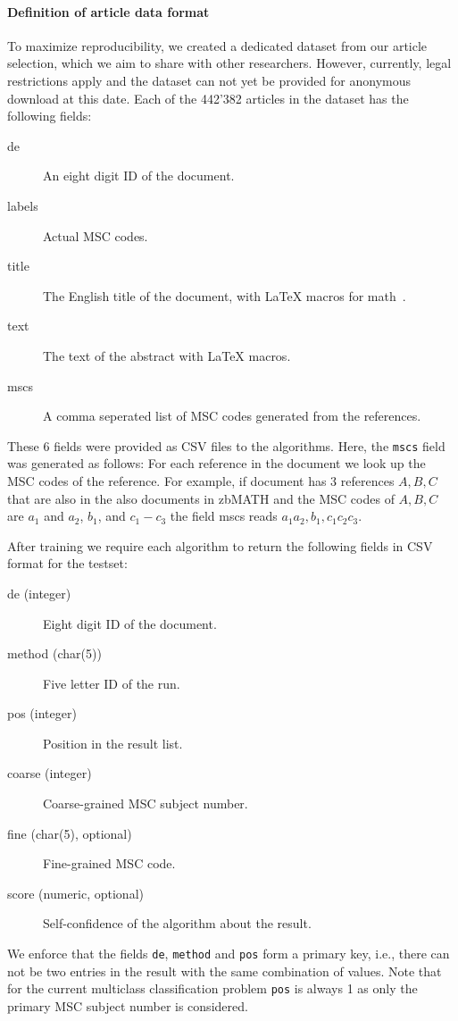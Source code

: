 \paragraph{Definition of article data format}
To maximize reproducibility, we created a dedicated dataset from our article selection, which we aim to share with other researchers.
However, currently, legal restrictions apply and the dataset can not yet be provided for anonymous download at this date.
Each of the 442'382 articles in the dataset has the following fields:
\begin{description}
  \item[de] An eight digit ID of the document\footnotemark.
  \item[labels] Actual MSC codes\footnotemark[\value{footnote}].
  \item[title] The English title of the document, with LaTeX macros for math~\cite{Schubotz2019b}.
  \item[text] The text of the abstract with LaTeX macros.
  \item[mscs] A comma seperated list of MSC codes generated from the references.
\end{description}
These 6 fields were provided as CSV files to the algorithms.
Here, the \texttt{mscs} field was generated as follows: For each reference in the document we look up the MSC codes of the reference. For example, if document has 3 references $A,B,C$ that are also in the also documents in zbMATH and the MSC codes of $A,B,C$ are $a_1$ and $a_2$, $b_1$, and $c_1-c_3$ the field mscs reads $a_1  a_2, b_1, c_1 c_2 c_3.$


After training we require each algorithm to return the following fields in CSV format for the testset:
\begin{description}
  \item[de (integer)] Eight digit ID of the document.
  \item[method (char(5))] Five letter ID of the run.
  \item[pos (integer)] Position in the result list.
  \item[coarse (integer)] Coarse-grained MSC subject number.
  \item[fine (char(5), optional)] Fine-grained MSC code.
  \item[score (numeric, optional)] Self-confidence of the algorithm about the result. 
\end{description}
We enforce that the fields \texttt{de}, \texttt{method} and \texttt{pos} form a primary key, i.e., there can not be two entries in the result with the same combination of values.
Note that for the current multiclass classification problem \texttt{pos} is always 1 as only the primary MSC subject number is considered.
